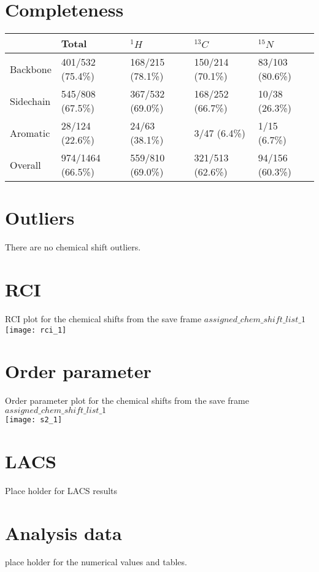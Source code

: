 \documentclass[12pt]{article}
\begin{document}
\section{Completeness}
\begin{longtable}{|l|l|l|l|l|}
\hline
  & Total & $^{1}H$ & $^{13}C$ & $^{15}N$\\\hline
Backbone & 401/532 (75.4\%)& 168/215 (78.1\%)& 150/214 (70.1\%)& 83/103 (80.6\%) \\
\hline
Sidechain & 545/808 (67.5\%)& 367/532 (69.0\%)& 168/252 (66.7\%)& 10/38 (26.3\%) \\
\hline
Aromatic & 28/124 (22.6\%)& 24/63 (38.1\%)& 3/47 (6.4\%)& 1/15 (6.7\%) \\
\hline
Overall & 974/1464 (66.5\%)& 559/810 (69.0\%)& 321/513 (62.6\%)& 94/156 (60.3\%) \\
\hline
\end{longtable}

\section{Outliers}
There are no chemical shift outliers.\
\section{RCI}
RCI plot for the chemical shifts from the  save frame $assigned\_chem\_shift\_list\_1$\\ \texttt{[image: rci\_1]}\\

\section{Order parameter}
Order parameter plot for the chemical shifts from the  save frame $assigned\_chem\_shift\_list\_1$\\ \texttt{[image: s2\_1]}\\

\section{LACS}
Place holder for LACS results
\section{Analysis data}
place holder for the numerical values and tables.
\end{document}
